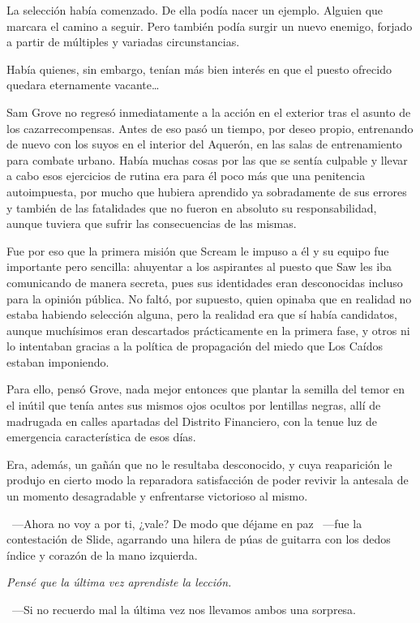 La selección había comenzado. De ella podía nacer un ejemplo. Alguien que marcara el camino a seguir. Pero también podía surgir un nuevo enemigo, forjado a partir de múltiples y variadas circunstancias.

Había quienes, sin embargo, tenían más bien interés en que el puesto ofrecido quedara eternamente vacante\dots

\fancyparbreak
Sam Grove no regresó inmediatamente a la acción en el exterior tras el asunto de los cazarrecompensas. Antes de eso pasó un tiempo, por deseo propio, entrenando de nuevo con los suyos en el interior del Aquerón, en las salas de entrenamiento para combate urbano. Había muchas cosas por las que se sentía culpable y llevar a cabo esos ejercicios de rutina era para él poco más que una penitencia autoimpuesta, por mucho que hubiera aprendido ya sobradamente de sus errores y también de las fatalidades que no fueron en absoluto su responsabilidad, aunque tuviera que sufrir las consecuencias de las mismas.

Fue por eso que la primera misión que Scream le impuso a él y su equipo fue importante pero sencilla: ahuyentar a los aspirantes al puesto que Saw les iba comunicando de manera secreta, pues sus identidades eran desconocidas incluso para la opinión pública. No faltó, por supuesto, quien opinaba que en realidad no estaba habiendo selección alguna, pero la realidad era que sí había candidatos, aunque muchísimos eran descartados prácticamente en la primera fase, y otros ni lo intentaban gracias a la política de propagación del miedo que Los Caídos estaban imponiendo.

Para ello, pensó Grove, nada mejor entonces que plantar la semilla del temor en el inútil que tenía antes sus mismos ojos ocultos por lentillas negras, allí de madrugada en calles apartadas del Distrito Financiero, con la tenue luz de emergencia característica de esos días.

Era, además, un gañán que no le resultaba desconocido, y cuya reaparición le produjo en cierto modo la reparadora satisfacción de poder revivir la antesala de un momento desagradable y enfrentarse victorioso al mismo.

~---Ahora no voy a por ti, ¿vale? De modo que déjame en paz ~---fue la contestación de Slide, agarrando una hilera de púas de guitarra con los dedos índice y corazón de la mano izquierda.

\emph{Pensé que la última vez aprendiste la lección.}

~---Si no recuerdo mal la última vez nos llevamos ambos una sorpresa.

